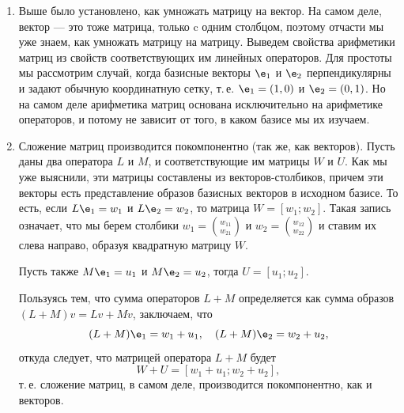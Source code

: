 \begin{enumerate}
\item Выше было установлено, как умножать матрицу на вектор. На самом деле, вектор --- это тоже матрица, только c одним столбцом, поэтому отчасти мы уже знаем, как умножать матрицу на матрицу. Выведем свойства арифметики матриц из свойств соответствующих им линейных операторов. Для простоты мы рассмотрим случай, когда базисные векторы $\e_1$ и $\e_2$ перпендикулярны и задают обычную координатную сетку, т.\,е. $\e_1=(1,0)$ и $\e_2=(0,1)$. Но на самом деле арифметика матриц основана исключительно на арифметике операторов, и потому не зависит от того, в каком базисе мы их изучаем.
\item Сложение матриц производится покомпонентно (так же, как векторов). Пусть даны два оператора $L$ и $M$, и  соответствующие им матрицы $W$ и $U$. Как мы уже выяснили, эти матрицы составлены из векторов-столбиков, причем эти векторы есть представление образов базисных векторов в исходном базисе. То есть, если $L\e_1=w_1$ и $L\e_2=w_2$, то матрица $W=[w_1;w_2]$. Такая запись означает, что мы берем столбики $w_1=\binom{w_{11}}{w_{21}}$ и $w_2=\binom{w_{12}}{w_{22}}$ и ставим их слева направо, образуя квадратную матрицу $W$.

Пусть также $M\e_1=u_1$ и $M\e_2=u_2$, тогда $U=[u_1;u_2]$.

Пользуясь тем, что сумма операторов $L+M$ определяется как сумма образов $(L+M)v=Lv+Mv$, заключаем, что
$$
(L+M)\e_1=w_1+u_1,\quad (L+M)\e_2=w_2+u_2,
$$
откуда следует, что матрицей оператора $L+M$ будет
$$
W+U = [w_1+u_1;w_2+u_2],
$$
т.\,е. сложение матриц, в самом деле, производится покомпонентно, как и векторов.


\end{enumerate}
